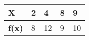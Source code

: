\begin{center}
\begin{tabular}{|l|l|l|l|l|}
\hline
\textbf{X} & \textbf{2} & \textbf{4} & \textbf{8} & \textbf{9} \\ \hline
\textbf{f(x)} & 8 & 12 & 9 & 10 \\ \hline
\end{tabular}
\end{center}